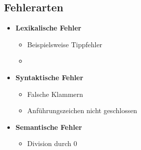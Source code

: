 \livecoding
\subsection{}



\subtitle{Kapitel 1: Erste Schritte}


\subsection{Fehlerarten}
\begin{frame}
    \slidehead
    \begin{itemize}
        \item \textbf{Lexikalische Fehler}
            \begin{itemize}
                \item Beispielsweise Tippfehler
                \item {}
            \end{itemize}
        \item \textbf{Syntaktische Fehler}
            \begin{itemize}
                \item Falsche Klammern
                \item Anführungszeichen nicht geschlossen
            \end{itemize}
        \item \textbf{Semantische Fehler}
            \begin{itemize}
                \item Division durch 0
            \end{itemize}
    \end{itemize}
\end{frame}

